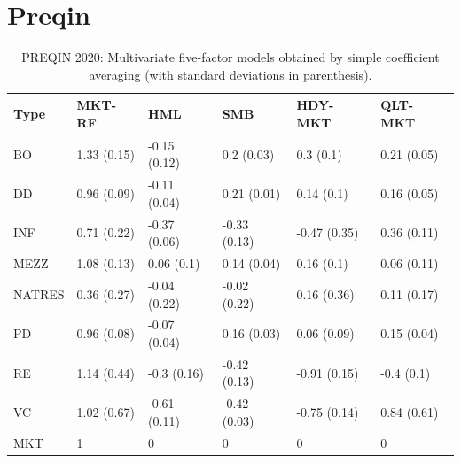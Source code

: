 
\clearpage


\section{Preqin}
\label{sec:preqin}


\begin{table}[ht]
	\centering
	\begin{tabular}{l@{\hskip 0.3in}l@{\hskip 0.2in}l@{\hskip 0.2in}l@{\hskip 0.2in}l@{\hskip 0.2in}l@{\hskip 0.1in}}
		Type & MKT-RF & HML & SMB & HDY-MKT & QLT-MKT \\ 
		\hline
		\hline
		BO & 1.33 (0.15) & -0.15 (0.12) & 0.2 (0.03) & 0.3 (0.1) & 0.21 (0.05) \\ 
		DD & 0.96 (0.09) & -0.11 (0.04) & 0.21 (0.01) & 0.14 (0.1) & 0.16 (0.05) \\ 
		INF & 0.71 (0.22) & -0.37 (0.06) & -0.33 (0.13) & -0.47 (0.35) & 0.36 (0.11) \\ 
		MEZZ & 1.08 (0.13) & 0.06 (0.1) & 0.14 (0.04) & 0.16 (0.1) & 0.06 (0.11) \\ 
		NATRES & 0.36 (0.27) & -0.04 (0.22) & -0.02 (0.22) & 0.16 (0.36) & 0.11 (0.17) \\ 
		PD & 0.96 (0.08) & -0.07 (0.04) & 0.16 (0.03) & 0.06 (0.09) & 0.15 (0.04) \\ 
		RE & 1.14 (0.44) & -0.3 (0.16) & -0.42 (0.13) & -0.91 (0.15) & -0.4 (0.1) \\ 
		VC & 1.02 (0.67) & -0.61 (0.11) & -0.42 (0.03) & -0.75 (0.14) & 0.84 (0.61) \\ 
		\hline
		MKT & 1 & 0 & 0 & 0 & 0 \\ 
		\hline
		\hline
	\end{tabular}
	\caption{
		PREQIN 2020: Multivariate five-factor models obtained by simple coefficient averaging (with standard deviations in parenthesis).
	} 
	\label{tab:average_coefs_preqin_2020}
\end{table}


